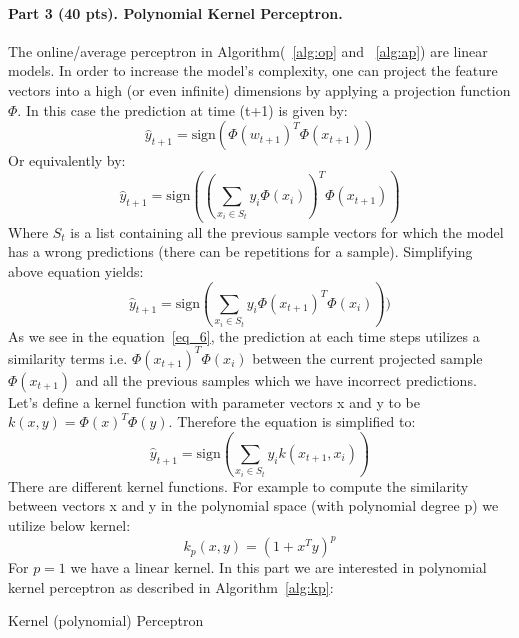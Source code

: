 \documentclass{article}
\begin{document}
{\paragraph{ Part 3 (40 pts).  Polynomial Kernel Perceptron.}
The online/average perceptron in Algorithm(~\ref{alg:op} and ~\ref{alg:ap}) are linear models. In order to increase the model's complexity, one can project the feature vectors into a high (or even infinite) dimensions by applying a projection function $\Phi$. In this case the prediction at time (t+1) is given by:\\
\begin{equation}
    \hat{y}_{t+1} = \mbox{sign}(\Phi(w_{t+1})^{T}\Phi(x_{t+1}))
\end{equation}
Or equivalently by:
\begin{equation}
    \hat{y}_{t+1} = \mbox{sign}((\sum_{x_i\in S_{t}}y_i\Phi(x_i))^{T}\Phi(x_{t+1}))
\end{equation}
Where $S_t$ is a list containing all the previous sample vectors for which the model has a wrong predictions (there can be repetitions for a sample). Simplifying above equation yields:\\
\begin{equation}
    \hat{y}_{t+1} = \mbox{sign}(\sum_{x_i\in S_{t}}y_i\Phi(x_{t+1})^{T}\Phi(x_i)))
    \label{eq_6}
\end{equation}
As we see in the equation~\ref{eq_6}, the prediction at each time steps utilizes a similarity terms i.e. $\Phi(x_{t+1})^{T}\Phi(x_i)$ between the current projected sample $\Phi(x_{t+1})$ and all the previous samples which we have incorrect predictions.\\
Let's define a kernel function with parameter vectors x and y to be $k(x, y)=\Phi(x)^{T}\Phi(y)$. Therefore the equation is simplified to: 
\begin{equation}
    \hat{y}_{t+1} = \mbox{sign}(\sum_{x_i\in S_{t}}y_i k(x_{t+1}, x_i))
    \label{eq_poly}
\end{equation}
There are different kernel functions. For example to compute the similarity between vectors x and y in the polynomial space (with polynomial degree p) we utilize below kernel:
\begin{equation}
    k_{p}(x, y) = (1 + x^{T}y)^{p}
    \label{kernel}
\end{equation}
For $p = 1$ we have a linear kernel. In this part we are interested in polynomial kernel perceptron as described in Algorithm~\ref{alg:kp}:
\begin{algorithm}
\caption{Kernel (polynomial) Perceptron}\label{alg:kp}

\end{algorithm}}
\end{document}
